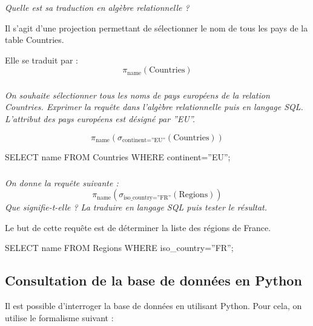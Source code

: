 \documentclass[10pt,fleqn]{article} %
\begin{document}
\textit{Quelle est sa traduction en algèbre relationnelle ?}

\ifprof
\begin{corrige}
Il s'agit d'une projection permettant de sélectionner le nom de tous les pays de la table Countries. 

Elle se traduit par :
$$
\pi_{\text{name}}\left(\text{Countries}\right)
$$
\end{corrige}
\else
\fi

\subparagraph{}
\textit{On souhaite sélectionner tous les noms de pays européens de la relation Countries.
 Exprimer la requête dans l'algèbre relationnelle puis en langage SQL. L'attribut des pays européens est désigné par ''EU''.}

\ifprof
\begin{corrige}
$$
\pi_{\text{name}}\left(\sigma_{\text{continent=''EU''}}\left(\text{Countries}\right)\right)
$$
\begin{envsql}
\begin{sql}
SELECT name FROM Countries WHERE continent=''EU'';
\end{sql}
\end{envsql}
\end{corrige}



\else
\fi

\subparagraph{}
\textit{On donne la requête suivante : 
$$\pi_{\text{name}}\left(\sigma_{\text{iso\_country=''FR''}} (\text{Regions})\right) $$
Que signifie-t-elle ? La traduire en langage SQL puis tester le résultat. }


\ifprof
\begin{corrige}
Le but de cette requête est de déterminer la liste des régions de France.

\begin{envsql}
\begin{sql}
SELECT name FROM Regions WHERE iso_country=''FR'';
\end{sql}
\end{envsql}
\end{corrige}
\else
\fi

\subsection*{Consultation de la base de données en Python}

\ifprof
\else

Il est possible d'interroger la base de données en utilisant Python. Pour cela, on utilise le formalisme suivant :
\end{document}
